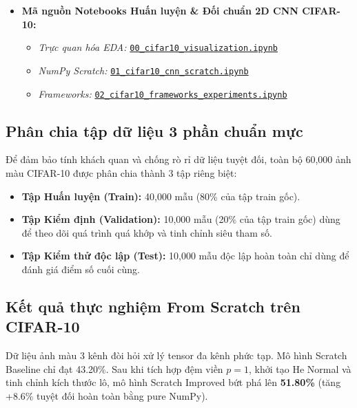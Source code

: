 \documentclass[12pt,a4paper]{report}
\begin{document}
\begin{itemize}[leftmargin=1.5em, itemsep=2pt]
    \item \textbf{Mã nguồn Notebooks Huấn luyện \& Đối chuẩn 2D CNN CIFAR-10:}
    \begin{itemize}[leftmargin=1.2em, itemsep=1.5pt]
        \item \textit{Trực quan hóa EDA:} \href{https://github.com/phamtu2x5/INTELLIGENT-SYSTEM-DEVELOPMENT/blob/main/src/Assigment%2004/cifar10/notebooks/00_cifar10_visualization.ipynb}{\texttt{00\_cifar10\_visualization.ipynb}}
        \item \textit{NumPy Scratch:} \href{https://github.com/phamtu2x5/INTELLIGENT-SYSTEM-DEVELOPMENT/blob/main/src/Assigment%2004/cifar10/notebooks/01_cifar10_cnn_scratch.ipynb}{\texttt{01\_cifar10\_cnn\_scratch.ipynb}}
        \item \textit{Frameworks:} \href{https://github.com/phamtu2x5/INTELLIGENT-SYSTEM-DEVELOPMENT/blob/main/src/Assigment%2004/cifar10/notebooks/02_cifar10_frameworks_experiments.ipynb}{\texttt{02\_cifar10\_frameworks\_experiments.ipynb}}
    \end{itemize}
\end{itemize}

\subsection{Phân chia tập dữ liệu 3 phần chuẩn mực}
Để đảm bảo tính khách quan và chống rò rỉ dữ liệu tuyệt đối, toàn bộ 60,000 ảnh màu CIFAR-10 được phân chia thành 3 tập riêng biệt:
\begin{itemize}
    \item \textbf{Tập Huấn luyện (Train):} 40,000 mẫu (80\% của tập train gốc).
    \item \textbf{Tập Kiểm định (Validation):} 10,000 mẫu (20\% của tập train gốc) dùng để theo dõi quá trình quá khớp và tinh chỉnh siêu tham số.
    \item \textbf{Tập Kiểm thử độc lập (Test):} 10,000 mẫu độc lập hoàn toàn chỉ dùng để đánh giá điểm số cuối cùng.
\end{itemize}

\subsection{Kết quả thực nghiệm From Scratch trên CIFAR-10}
Dữ liệu ảnh màu 3 kênh đòi hỏi xử lý tensor đa kênh phức tạp. Mô hình Scratch Baseline chỉ đạt 43.20\%. Sau khi tích hợp đệm viền $p=1$, khởi tạo He Normal và tinh chỉnh kích thước lô, mô hình Scratch Improved bứt phá lên \textbf{51.80\%} (tăng +8.6\% tuyệt đối hoàn toàn bằng pure NumPy).
\end{document}
